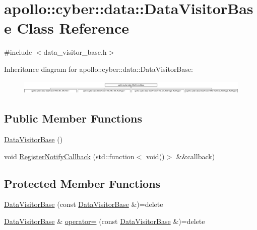 \hypertarget{classapollo_1_1cyber_1_1data_1_1DataVisitorBase}{\section{apollo\-:\-:cyber\-:\-:data\-:\-:Data\-Visitor\-Base Class Reference}
\label{classapollo_1_1cyber_1_1data_1_1DataVisitorBase}
}


{\ttfamily \#include $<$data\-\_\-visitor\-\_\-base.\-h$>$}

Inheritance diagram for apollo\-:\-:cyber\-:\-:data\-:\-:Data\-Visitor\-Base\-:\begin{figure}[H]
\begin{center}
\leavevmode
\includegraphics[height=0.682927cm]{classapollo_1_1cyber_1_1data_1_1DataVisitorBase}
\end{center}
\end{figure}
\subsection*{Public Member Functions}
\begin{DoxyCompactItemize}
\item 
\hyperlink{classapollo_1_1cyber_1_1data_1_1DataVisitorBase_a8197ea5e78feb49af879c99bf313cad9}{Data\-Visitor\-Base} ()
\item 
void \hyperlink{classapollo_1_1cyber_1_1data_1_1DataVisitorBase_af810d69a0f617eef9f86ac579f2a4339}{Register\-Notify\-Callback} (std\-::function$<$ void()$>$ \&\&callback)
\end{DoxyCompactItemize}
\subsection*{Protected Member Functions}
\begin{DoxyCompactItemize}
\item 
\hyperlink{classapollo_1_1cyber_1_1data_1_1DataVisitorBase_a1114079807721d7986c48b0b7fc00b5c}{Data\-Visitor\-Base} (const \hyperlink{classapollo_1_1cyber_1_1data_1_1DataVisitorBase}{Data\-Visitor\-Base} \&)=delete
\item 
\hyperlink{classapollo_1_1cyber_1_1data_1_1DataVisitorBase}{Data\-Visitor\-Base} \& \hyperlink{classapollo_1_1cyber_1_1data_1_1DataVisitorBase_ae4533b7ce5ee6dcaf617c1ff1f42d052}{operator=} (const \hyperlink{classapollo_1_1cyber_1_1data_1_1DataVisitorBase}{Data\-Visitor\-Base} \&)=delete
\end{DoxyCompactItemize}
